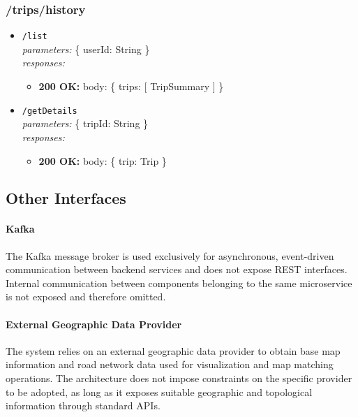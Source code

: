 \subsubsection*{/trips/history}

\begin{itemize}
    \item \texttt{/list} \\
    \textit{parameters:} \{ userId: String \} \\
    \textit{responses:}
    \begin{itemize}
        \item \textbf{200 OK:} body: \{ trips: [ TripSummary ] \}
    \end{itemize}

    \item \texttt{/getDetails} \\
    \textit{parameters:} \{ tripId: String \} \\
    \textit{responses:}
    \begin{itemize}
        \item \textbf{200 OK:} body: \{ trip: Trip \}
    \end{itemize}
\end{itemize}

\subsection{Other Interfaces}

\paragraph{Kafka}The Kafka message broker is used exclusively for asynchronous, event-driven communication between backend services and does not expose REST interfaces. Internal communication between components belonging to the same microservice is not exposed and therefore omitted.

\paragraph{External Geographic Data Provider}
The system relies on an external geographic data provider to obtain base map information and road network data used for visualization and map matching operations. The architecture does not impose constraints on the specific provider to be adopted, as long as it exposes suitable geographic and topological information through standard APIs.

